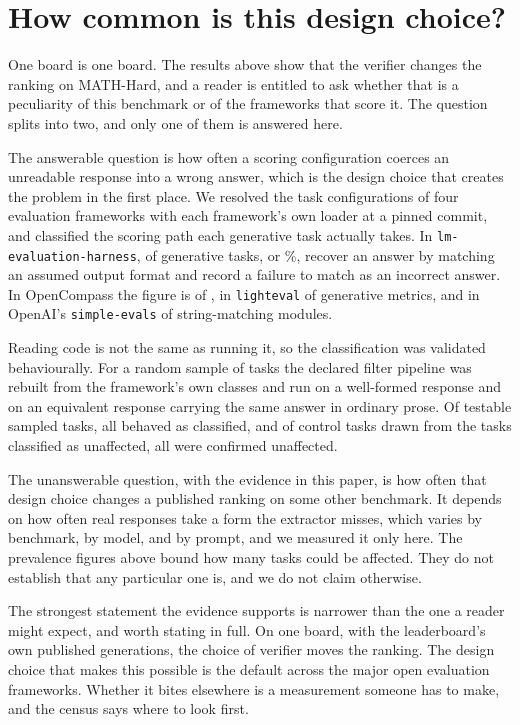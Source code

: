 
\section{How common is this design choice?}
\label{sec:generality}

One board is one board. The results above show that the verifier changes the ranking on
MATH-Hard, and a reader is entitled to ask whether that is a peculiarity of this benchmark or
of the frameworks that score it. The question splits into two, and only one of them is
answered here.

The answerable question is how often a scoring configuration coerces an unreadable response
into a wrong answer, which is the design choice that creates the problem in the first place.
We resolved the task configurations of four evaluation frameworks
\citep{biderman2024lessons, opencompass2026, fourrier2024lighteval, openai2024simpleevals} with each framework's own
loader at a pinned commit, and classified the scoring path each generative task actually
takes. In \texttt{lm-evaluation-harness}, \LmEvalCoerce{} of \LmEvalGenerative{} generative
tasks, or \LmEvalCoercePct\%, recover an answer by matching an assumed output format and
record a failure to match as an incorrect answer. In OpenCompass the figure is
\OpenCompassCoerce{} of \OpenCompassGenerative{}, in \texttt{lighteval}
\LightevalCoerce{} of \LightevalGenerative{} generative metrics, and in OpenAI's
\texttt{simple-evals} \SimpleEvalsCoerce{} of \SimpleEvalsStringMatch{} string-matching
modules.

Reading code is not the same as running it, so the classification was validated behaviourally.
For a random sample of tasks the declared filter pipeline was rebuilt from the framework's own
classes and run on a well-formed response and on an equivalent response carrying the same
answer in ordinary prose. Of \CensusValidTestable{} testable sampled tasks, all
\CensusValidConfirmed{} behaved as classified, and of \CensusControlN{} control tasks drawn
from the tasks classified as unaffected, all \CensusControlClean{} were confirmed unaffected.

The unanswerable question, with the evidence in this paper, is how often that design choice
changes a published ranking on some other benchmark. It depends on how often real responses
take a form the extractor misses, which varies by benchmark, by model, and by prompt, and we
measured it only here. The prevalence figures above bound how many tasks could be affected.
They do not establish that any particular one is, and we do not claim otherwise.

The strongest statement the evidence supports is narrower than the one a reader might expect,
and worth stating in full. On one board, with the leaderboard's own published generations, the
choice of verifier moves the ranking. The design choice that makes this possible is the
default across the major open evaluation frameworks. Whether it bites elsewhere is a
measurement someone has to make, and the census says where to look first.
